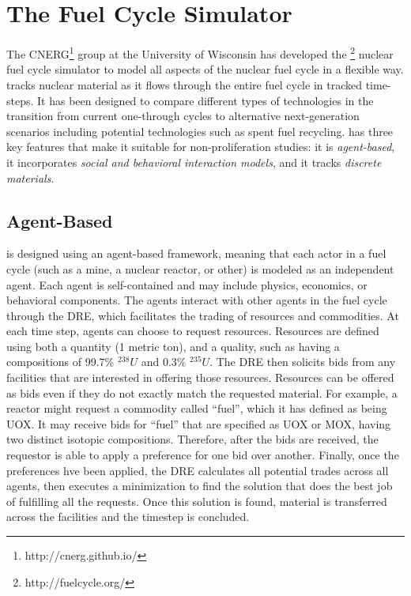 \section{The \Cyclus Fuel Cycle Simulator}
\label{s_methods}

The \gls{CNERG}\footnote{http://cnerg.github.io/} group at the University of Wisconsin has developed the \Cyclus\footnote{http://fuelcycle.org/} nuclear fuel cycle simulator to model all aspects of the nuclear fuel cycle in a flexible way\cite{cyclus_v1_0,cyclus_v1_2,cyclus_v1_3}.  \Cyclus tracks nuclear material as it flows through the entire fuel cycle in tracked time-steps. It has been designed to compare different types of technologies in the transition from current one-through cycles to alternative next-generation scenarios including potential technologies such as spent fuel recycling. \Cyclus has three key features that make it suitable for non-proliferation studies: it is \emph{agent-based}, it incorporates \emph{social and behavioral interaction models}, and it tracks \emph{discrete materials}.

\subsection{Agent-Based}
\Cyclus is designed using an agent-based framework, meaning that each actor in a fuel cycle (such as a mine, a nuclear reactor, or other) is modeled as an independent agent\cite{jennings_agent-based_2000, taylor2014agent}. Each agent is self-contained and may include physics, economics, or behavioral components\cite{huff_open_2011,gidden_agent-based_2013,gidden_agent-based_2015}.  The agents interact with other agents in the fuel cycle through the \gls{DRE}, which facilitates the trading of resources and commodities\cite{gidden_agent-based_2014}.  At each time step, agents can choose to request resources.  Resources are defined using both a quantity (1 metric ton), and a quality, such as having a compositions of 99.7\% $^{238}U$ and 0.3\% $^{235}U$.  The \gls{DRE} then solicits bids from any facilities that are interested in offering those resources. Resources can be offered as bids even if they do not exactly match the requested material. For example, a reactor might request a commodity called ``fuel'', which it has defined as being \gls{UOX}.  It may receive bids for ``fuel'' that are specified as \gls{UOX} or \gls{MOX}, having two distinct isotopic compositions. Therefore, after the bids are received, the requestor is able to apply a preference for one bid over another. Finally, once the preferences hve been applied, the \gls{DRE} calculates all potential trades across all agents, then executes a minimization to find the solution that does the best job of fulfilling all the requests.  Once this solution is found, material is transferred across the facilities and the timestep is concluded.

